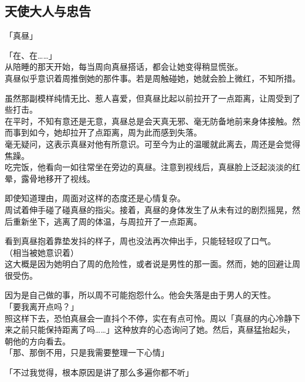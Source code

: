 \subsection{天使大人与忠告}

「真昼」

「在、在……」\\

从陪睡的那天开始，每当周向真昼搭话，都会让她变得稍显慌张。\\

真昼似乎意识着周推倒她的那件事。若是周触碰她，她就会脸上微红，不知所措。

虽然那副模样纯情无比、惹人喜爱，但真昼比起以前拉开了一点距离，让周受到了些打击。\\

在平时，不知有意还是无意，真昼总是会天真无邪、毫无防备地前来身体接触。然而事到如今，她却拉开了点距离，周为此而感到失落。\\

毫无疑问，这表示真昼对他有所意识。可至今为止的温暖就此离去，周还是会觉得焦躁。\\

吃完饭，他看向一如往常坐在旁边的真昼。注意到视线后，真昼脸上泛起淡淡的红晕，露骨地移开了视线。

即使知道理由，周面对这样的态度还是心情复杂。\\

周试着伸手碰了碰真昼的指尖。接着，真昼的身体发生了从未有过的剧烈摇晃，然后重新坐下，逃离了周的体温，与周拉开了一点距离。

看到真昼抱着靠垫发抖的样子，周也没法再次伸出手，只能轻轻叹了口气。\\

（相当被她意识着）\\

这大概是因为她明白了周的危险性，或者说是男性的那一面。然而，她的回避让周很受伤。

因为是自己做的事，所以周不可能抱怨什么。他会失落是由于男人的天性。\\

「要我离开点吗？」\\

照这样下去，恐怕真昼会一直抖个不停，实在有点可怜。周以「真昼的内心冷静下来之前只能保持距离了吗……」这种放弃的心态询问了她。然后，真昼猛抬起头，朝他的方向看去。\\

「那、那倒不用，只是我需要整理一下心情」

「不过我觉得，根本原因是讲了那么多遍你都不听」

